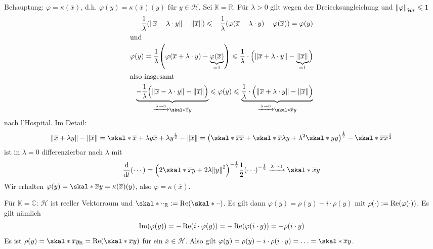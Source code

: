 \begin{enumerate}[(i)]
	Behauptung: $\varphi= \kappa(\overline{x})$, d.h. $\varphi(y)= \kappa(\overline{x})(y)$ für $y \in \mathcal{H}$. Sei $\mathds{K}=\mathds{R}$. Für $\lambda>0$ gilt
	wegen der Dreiecksungleichung und $\norm[\mathcal{H}*]{\varphi}\le 1$
	\begin{align*}
		-\frac{1}{\lambda} \enbrace*{\norm{\overline{x} - \lambda \cdot y } - \norm{\overline{x}}} \le -\frac{1}{\lambda} \enbrace*{\varphi \enbrace*{\overline{x}- \lambda 
		\cdot y} - \varphi(\overline{x})} = \varphi(y) \\
		\shortintertext{und}
		\varphi(y) = \frac{1}{\lambda} \enbrace*{\varphi(\overline{x}+\lambda \cdot y) - \underbrace{\varphi(\overline{x})}_{=1}} 
		\le \frac{1}{\lambda} \cdot \enbrace[\Big]{\norm{\overline{x} + \lambda \cdot y } - \underbrace{\norm{\overline{x}}}_{=1} }    \\
		\shortintertext{also insgesamt}
		 \underbrace{-\frac{1}{\lambda} \enbrace[\Big]{\norm{\overline{x} - \lambda \cdot y } - \norm{\overline{x}}} }_{\xrightarrow{\lambda \to 0} \skal*{\overline{x}}{y}}
		 \le \varphi(y) 
		 \le \underbrace{\frac{1}{\lambda} \cdot \enbrace[\Big]{\norm{\overline{x} +\lambda\cdot y} - \norm{\overline{x}}}}_{\xrightarrow{\lambda \to 0} \skal*{\overline{x}}{y}}
	\end{align*}
	nach l'Hospital. Im Detail: 
	\begin{align*}
		\norm{\overline{x} + \lambda y} - \norm{\overline{x}} = \skal*{\overline{x} + \lambda y }{\overline{x} + \lambda y }^{\frac{1}{2}} - \norm{\overline{x}}= \enbrace*{\skal*{\overline{x}}{\overline{x}} +
		\skal*{\overline{x}}{\lambda y} + \lambda^2 \skal*{y}{y}}^{\frac{1}{2}} - \skal*{\overline{x}}{\overline{x}}^{\frac{1}{2}}
	\end{align*}
	ist in $\lambda=0$ differenzierbar nach $\lambda$ mit 
	\[
		\diffd{}{t}(\cdots) = \enbrace*{2 \skal*{\overline{x}}{y} + 2 \lambda \norm{y}^2}^{-\frac{1}{2} } \frac{1}{2} \enbrace*{\cdots}^{-\frac{1}{2}} 
		\xrightarrow{\lambda \to 0}  \skal*{\overline{x}}{y}
	\]
	Wir erhalten $\varphi(y)= \skal*{\overline{x}}{y} = \kappa(\overline{x})(y)$, also $\varphi=\kappa(\overline{x})$. 
	
	Für $\mathds{K}=\mathds{C}$: $\mathcal{H}$ ist reeller Vektorraum und $\skal*{\cdot}{\cdot}_\mathds{R} := \re \enbrace*{\skal*{\cdot}{\cdot}}$. Es gilt dann 
	$\varphi(y) = \rho(y) - i \cdot \rho(y)$ mit $\rho(\cdot ) := \re \enbrace*{\varphi(\cdot )}$. Es gilt nämlich
	\[
		\im \enbrace*{\varphi(y)} = - \re \enbrace*{i \cdot \varphi(y)} = - \re \enbrace*{\varphi(i \cdot y)} = - \rho (i \cdot y)   
	\]
	Es ist $\rho(y) = \skal*{\overline{x}}{y}_\mathds{R} = \re \enbrace*{\skal*{\overline{x}}{y}}$ für ein $\overline{x} \in \mathcal{H}$. Also gilt
	$\varphi(y)= \rho(y)- i \cdot \rho(i \cdot y)= \ldots = \skal*{\overline{x}}{y}$. \bewende
\end{enumerate}

